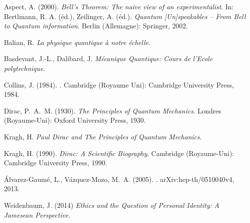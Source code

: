 \begin{thebibliography}{99}

 Aspect, A. (2000). \textit{Bell's Theorem: The naive view of an experimentalist}. In: Bertlmann, R. A. (éd.), Zeilinger, A. (éd.). \textit{Quantum [Un]speakables – From Bell to Quantum information}. Berlin (Allemagne): Springer, 2002.

 Balian, R. \textit{La physique quantique à notre échelle}.

 Basdevant, J.-L., Dalibard, J. \textit{Mécanique Quantique: Cours de l'Ecole polytechnique}.

 Collins, J. (1984). . Cambridge (Royaume Uni): Cambridge University Press, 1984.

 Dirac, P.~A.~M. (1930). \textit{The Principles of Quantum Mechanics}. Londres (Royaume-Uni): Oxford University Press, 1930.

 Kragh, H. \textit{Paul Dirac and The Principles of Quantum Mechanics}.

 Kragh, H. (1990). \textit{Dirac: A Scientific Biography}. Cambridge (Royaume-Uni): Cambridge University Press, 1990.

 Álvarez-Gaumé, L., Vázquez-Mozo, M.~A. (2005). . arXiv:hep-th/0510040v4, 2013.

 Weidenbaum, J. (2014) \textit{Ethics and the Question of Personal Identity: A Jamesean Perspective}.

\end{thebibliography}
